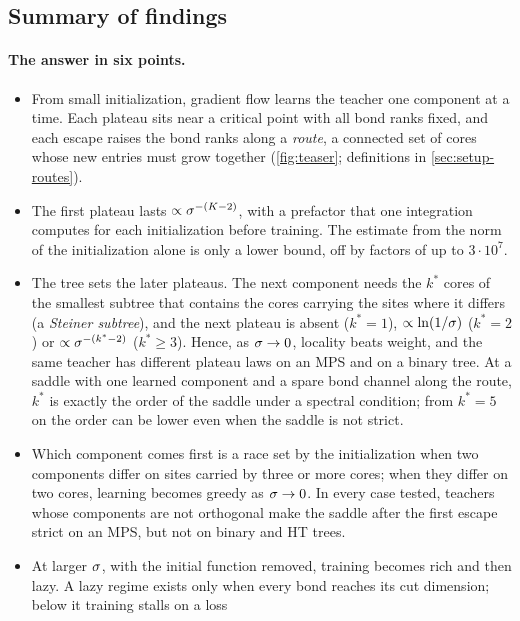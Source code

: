 \subsection{Summary of findings}\label{sec:intro-summary}

\paragraph{The answer in six points.}
\begin{itemize}[leftmargin=*,itemsep=2pt]
  \item From small initialization, gradient flow learns the teacher one component at a time. Each
    plateau sits near a critical point with all bond ranks fixed, and each escape raises the bond ranks
    along a \emph{route}, a connected set of cores whose new entries must grow together
    (\cref{fig:teaser}; definitions in \cref{sec:setup-routes}).
  \item The first plateau lasts $\propto\sigma^{-(K-2)}$, with a prefactor that one integration computes
    for each initialization before training. The estimate from the norm of the initialization alone is
    only a lower bound, off by factors of up to $3\cdot10^7$.
  \item The tree sets the later plateaus. The next component needs the $k^*$ cores of the smallest
    subtree that contains the cores carrying the sites where it differs (a \emph{Steiner subtree}), and
    the next plateau is absent ($k^*=1$), $\propto\ln(1/\sigma)$ ($k^*=2$) or $\propto\sigma^{-(k^*-2)}$
    ($k^*\ge3$). Hence, as $\sigma\to0$, locality beats weight, and the same teacher has different plateau
    laws on an MPS and on a binary tree. At a saddle with one learned component and a spare bond channel
    along the route, $k^*$ is exactly the order of the saddle under a spectral condition; from $k^*=5$ on
    the order can be lower even when the saddle is not strict.
  \item Which component comes first is a race set by the initialization when two components differ on
    sites carried by three or more cores; when they differ on two cores, learning becomes greedy as
    $\sigma\to0$. In every case tested, teachers whose components are not orthogonal make the saddle after
    the first escape strict on an MPS, but not on binary and HT trees.
  \item At larger $\sigma$, with the initial function removed, training becomes rich and then lazy. A lazy
    regime exists only when every bond reaches its cut dimension; below it training stalls on a loss

\end{itemize}
